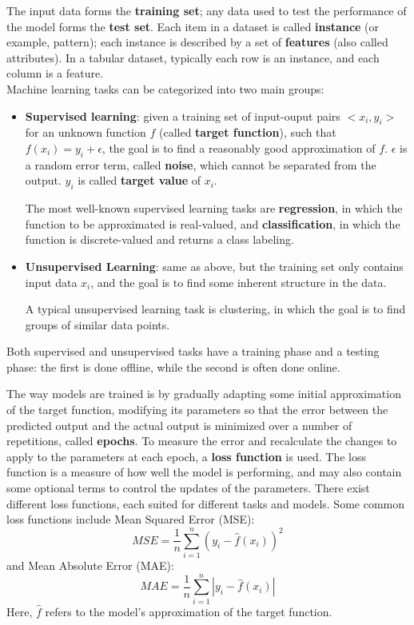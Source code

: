 The input data forms the \textbf{training set}; any data used to test the performance of the model forms the \textbf{test set}. Each item in a dataset is called \textbf{instance} (or example, pattern); each instance is described by a set of \textbf{features} (also called attributes). In a tabular dataset, typically each row is an instance, and each column is a feature.
\\
Machine learning tasks can be categorized into two main groups:
\begin{itemize}
    \item \textbf{Supervised learning}: given a training set of input-ouput pairs $<x_i,y_i>$ for an unknown function $f$ (called \textbf{target function}), such that $f(x_i) = y_i + \epsilon$, the goal is to find a reasonably good approximation of $f$. $\epsilon$ is a random error term, called \textbf{noise}, which cannot be separated from the output. $y_i$ is called \textbf{target value} of $x_i$.
    
    The most well-known supervised learning tasks are \textbf{regression}, in which the function to be approximated is real-valued, and \textbf{classification}, in which the function is discrete-valued and returns a class labeling.

    \item \textbf{Unsupervised Learning}: same as above, but the training set only contains input data $x_i$, and the goal is to find some inherent structure in the data.

    A typical unsupervised learning task is clustering, in which the goal is to find groups of similar data points.
\end{itemize}
Both supervised and unsupervised tasks have a training phase and a testing phase: the first is done offline, while the second is often done online.

The way models are trained is by gradually adapting some initial approximation of the target function, modifying its parameters so that the error between the predicted output and the actual output is minimized over a number of repetitions, called \textbf{epochs}. To measure the error and recalculate the changes to apply to the parameters at each epoch, a \textbf{loss function} is used. The loss function is a measure of how well the model is performing, and may also contain some optional terms to control the updates of the parameters. There exist different loss functions, each suited for different tasks and models. Some common loss functions include Mean Squared Error (MSE):
\begin{equation*}
    \textit{MSE} = \frac{1}{n} \sum_{i=1}^n (y_i - \hat{f}(x_i))^2
\end{equation*}
and Mean Absolute Error (MAE):
\begin{equation*}
    \textit{MAE} = \frac{1}{n} \sum_{i=1}^n |y_i - \hat{f}(x_i)|
\end{equation*}
Here, $\hat{f}$ refers to the model's approximation of the target function.

